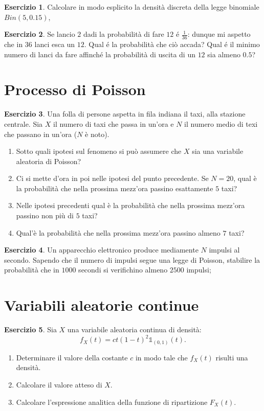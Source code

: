 \documentclass[12pt,a4paper]{article}
\theoremstyle{definition}
\newtheorem{exe}{Esercizio}
\begin{document}
\begin{exe}
	Calcolare in modo esplicito la densità discreta della legge binomiale $ Bin(5, 0.15) $,
\end{exe}

\begin{exe}
	Se lancio $ 2 $ dadi la probabilità di fare $ 12 $ é $ \frac{1}{36} $: dunque mi aspetto che in $ 36 $ lanci esca un $ 12 $. Qual é la probabilità che ciò accada? Qual é il minimo numero di lanci da fare affinché la probabilità di uscita di un $ 12 $ sia almeno $ 0.5 $?
\end{exe}

\section{Processo di Poisson}

\begin{exe} Una folla di persone aspetta in fila indiana il taxi, alla stazione centrale. Sia $ X $ il numero di taxi che passa in un'ora e $ N $ il numero medio di texi che passano in un'ora ($ N $ è noto).
	\begin{enumerate}
		\item Sotto quali ipotesi sul fenomeno si può assumere che $ X $ sia una variabile aleatoria di Poisson?
		\item Ci si mette d'ora in poi nelle ipotesi del punto precedente. Se $ N = 20 $, qual è la probabilità che nella prossima mezz'ora passino esattamente $ 5 $ taxi?
		\item Nelle ipotesi precedenti qual è la probabilità che nella prossima mezz'ora passino non più di $ 5 $ taxi?
		\item  Qual'è la probabilità che nella prossima mezz'ora passino almeno $ 7 $ taxi?
	\end{enumerate}
\end{exe}

\begin{exe}
	Un apparecchio elettronico produce mediamente $ N $ impulsi al secondo. Sapendo che il numero di impulsi segue una legge di Poisson, stabilire la probabilità che in $ 1000 $ secondi si verifichino almeno $ 2500 $ impulsi;
\end{exe}

\section{Variabili aleatorie continue}

\begin{exe}
	Sia $ X $ una variabile aleatoria continua di densità:
	\[ f_{X}(t) = ct(1-t)^2 \mathds{1}_{(0,1)}(t).\]
	\begin{enumerate}
		\item Determinare il valore della costante $ c $ in modo tale che $ f_{X}(t) $ risulti una densità.
		\item Calcolare il valore atteso di $ X $.
		\item Calcolare l'espressione analitica della funzione di ripartizione $ F_{X}(t) $.
	\end{enumerate}
\end{exe}
\end{document}
